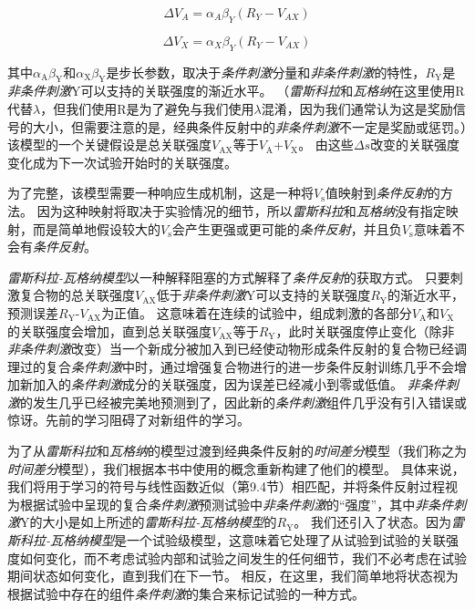 \begin{equation}
	\Delta V_A = \alpha_A \beta_Y
	(R_Y - V_{AX})
\end{equation}


\begin{equation}
	\Delta V_X = 
	\alpha_X \beta_Y
	(R_Y - V_{AX})
\end{equation}

其中$\alpha_{\mathrm{A}} \beta_{\mathrm{Y}}$和$\alpha_{\mathrm{X}} \beta_{\mathrm{Y}}$是步长参数，取决于\textit{条件刺激}分量和\textit{非条件刺激}的特性，$R_{\mathrm{Y}}$是\textit{非条件刺激}Y可以支持的关联强度的渐近水平。
（\textit{雷斯科拉}和\textit{瓦格纳}在这里使用R代替$\lambda$，但我们使用R是为了避免与我们使用$\lambda$混淆，因为我们通常认为这是奖励信号的大小，但需要注意的是，经典条件反射中的\textit{非条件刺激}不一定是奖励或惩罚。）该模型的一个关键假设是总关联强度$V_{\mathrm{AX}}$等于$V_{\mathrm{A}}$+$V_{\mathrm{X}}$。
由这些$\Delta s$改变的关联强度变化成为下一次试验开始时的关联强度。


为了完整，该模型需要一种响应生成机制，这是一种将$V_{\mathrm{s}}$值映射到\textit{条件反射}的方法。
因为这种映射将取决于实验情况的细节，所以\textit{雷斯科拉}和\textit{瓦格纳}没有指定映射，而是简单地假设较大的$V_{\mathrm{s}}$会产生更强或更可能的\textit{条件反射}，并且负$V_{\mathrm{s}}$意味着不会有\textit{条件反射}。



\textit{雷斯科拉-瓦格纳模型}以一种解释阻塞的方式解释了\textit{条件反射}的获取方式。
只要刺激复合物的总关联强度$V_{\mathrm{AX}}$低于\textit{非条件刺激}Y可以支持的关联强度$R_{\mathrm{Y}}$的渐近水平，预测误差$R_{\mathrm{Y}}$-$V_{\mathrm{AX}}$为正值。
这意味着在连续的试验中，组成刺激的各部分$V_{\mathrm{A}}$和$V_{\mathrm{X}}$的关联强度会增加，直到总关联强度$V_{\mathrm{AX}}$等于$R_{\mathrm{Y}}$，此时关联强度停止变化（除非\textit{非条件刺激}改变）当一个新成分被加入到已经使动物形成条件反射的复合物已经调理过的复合\textit{条件刺激}中时，通过增强复合物进行的进一步条件反射训练几乎不会增加新加入的\textit{条件刺激}成分的关联强度，因为误差已经减小到零或低值。
\textit{非条件刺激}的发生几乎已经被完美地预测到了，因此新的\textit{条件刺激}组件几乎没有引入错误或惊讶。先前的学习阻碍了对新组件的学习。



为了从\textit{雷斯科拉}和\textit{瓦格纳}的模型过渡到经典条件反射的\textit{时间差分}模型（我们称之为\textit{时间差分}模型），我们根据本书中使用的概念重新构建了他们的模型。
具体来说，我们将用于学习的符号与线性函数近似（第9.4节）相匹配，并将条件反射过程视为根据试验中呈现的复合\textit{条件刺激}预测试验中\textit{非条件刺激}的“强度”，其中\textit{非条件刺激}Y的大小是如上所述的\textit{雷斯科拉-瓦格纳模型}的$R_{\mathrm{Y}}$。
我们还引入了状态。因为\textit{雷斯科拉-瓦格纳模型}是一个试验级模型，这意味着它处理了从试验到试验的关联强度如何变化，而不考虑试验内部和试验之间发生的任何细节，我们不必考虑在试验期间状态如何变化，直到我们在下一节。
相反，在这里，我们简单地将状态视为根据试验中存在的组件\textit{条件刺激}的集合来标记试验的一种方式。


